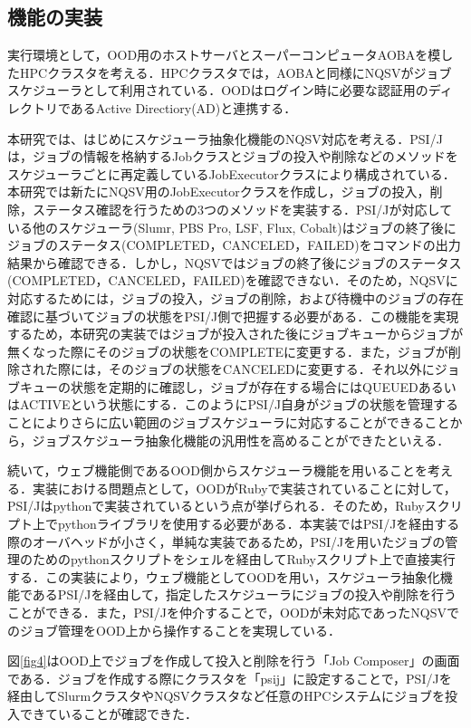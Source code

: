 \documentclass[a4paper,oneside,twocolumn,notitlepage,dvipdfmx]{jsarticle}
\begin{document}
\subsection{機能の実装}
実行環境として，OOD用のホストサーバとスーパーコンピュータAOBAを模したHPCクラスタを考える．HPCクラスタでは，AOBAと同様にNQSVがジョブスケジューラとして利用されている．OODはログイン時に必要な認証用のディレクトリであるActive Directiory(AD)と連携する．\par
本研究では、はじめにスケジューラ抽象化機能のNQSV対応を考える．PSI/Jは，ジョブの情報を格納するJobクラスとジョブの投入や削除などのメソッドをスケジューラごとに再定義しているJobExecutorクラスにより構成されている．本研究では新たにNQSV用のJobExecutorクラスを作成し，ジョブの投入，削除，ステータス確認を行うための3つのメソッドを実装する．PSI/Jが対応している他のスケジューラ(Slumr, PBS Pro, LSF, Flux, Cobalt)はジョブの終了後にジョブのステータス(COMPLETED，CANCELED，FAILED)をコマンドの出力結果から確認できる．しかし，NQSVではジョブの終了後にジョブのステータス(COMPLETED，CANCELED，FAILED)を確認できない．そのため，NQSVに対応するためには，ジョブの投入，ジョブの削除，および待機中のジョブの存在確認に基づいてジョブの状態をPSI/J側で把握する必要がある．この機能を実現するため，本研究の実装ではジョブが投入された後にジョブキューからジョブが無くなった際にそのジョブの状態をCOMPLETEに変更する．また，ジョブが削除された際には，そのジョブの状態をCANCELEDに変更する．それ以外にジョブキューの状態を定期的に確認し，ジョブが存在する場合にはQUEUEDあるいはACTIVEという状態にする．このようにPSI/J自身がジョブの状態を管理することによりさらに広い範囲のジョブスケジューラに対応することができることから，ジョブスケジューラ抽象化機能の汎用性を高めることができたといえる．\par
続いて，ウェブ機能側であるOOD側からスケジューラ機能を用いることを考える．実装における問題点として，OODがRubyで実装されていることに対して，PSI/Jはpythonで実装されているという点が挙げられる．そのため，Rubyスクリプト上でpythonライブラリを使用する必要がある．本実装ではPSI/Jを経由する際のオーバヘッドが小さく，単純な実装であるため，PSI/Jを用いたジョブの管理のためのpythonスクリプトをシェルを経由してRubyスクリプト上で直接実行する．この実装により，ウェブ機能としてOODを用い，スケジューラ抽象化機能であるPSI/Jを経由して，指定したスケジューラにジョブの投入や削除を行うことができる．また，PSI/Jを仲介することで，OODが未対応であったNQSVでのジョブ管理をOOD上から操作することを実現している．\par
図\ref{fig4}はOOD上でジョブを作成して投入と削除を行う「Job Composer」の画面である．ジョブを作成する際にクラスタを「psij」に設定することで，PSI/Jを経由してSlurmクラスタやNQSVクラスタなど任意のHPCシステムにジョブを投入できていることが確認できた．\par
\end{document}
